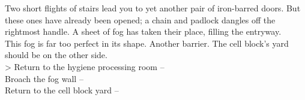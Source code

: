 Two short flights of stairs lead you to yet another pair of iron-barred doors. But these ones have already been opened; a chain and padlock dangles off the rightmost handle. A sheet of fog has taken their place, filling the entryway.\\

This fog is far too perfect in its shape. Another barrier. The cell block’s yard should be on the other side.\\

> Return to the hygiene processing room -- \\
 Broach the fog wall -- \\
 Return to the cell block yard -- 